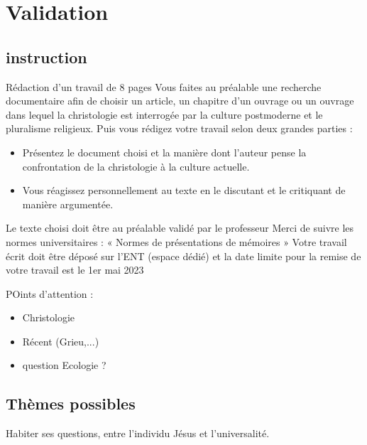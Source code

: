 \chapter{Validation}

\section{instruction}
 
Rédaction d’un travail de 8 pages
Vous faites au préalable une recherche documentaire afin de choisir un article, un chapitre
d’un ouvrage ou un ouvrage dans lequel la christologie est interrogée par la culture
postmoderne et le pluralisme religieux.
Puis vous rédigez votre travail selon deux grandes parties :
\begin{itemize}
    \item  Présentez le document choisi et la manière dont l’auteur pense la confrontation de la
christologie à la culture actuelle.
    \item  Vous réagissez personnellement au texte en le discutant et le critiquant de manière
argumentée.
\end{itemize}

Le texte choisi doit être au préalable validé par le professeur
Merci de suivre les normes universitaires : « Normes de présentations de mémoires »
Votre travail écrit doit être déposé sur l’ENT (espace dédié) et la date limite pour la
remise de votre travail est le 1er mai 2023

POints d'attention : 
\begin{itemize}
    \item Christologie
    \item Récent (Grieu,...)
    \item question Ecologie ?
\end{itemize}


\section{Thèmes possibles}

Habiter ses questions, entre l'individu Jésus et l'universalité. 
